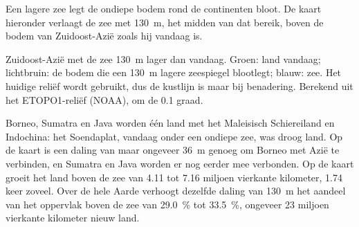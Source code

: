 Een lagere zee legt de ondiepe bodem rond de continenten bloot. De kaart hieronder
verlaagt de zee met \qty{130}{m}, het midden van dat bereik, boven de bodem van
Zuidoost-Azië zoals hij vandaag is.

\begin{omfigure}

{\small Zuidoost-Azië met de zee \qty{130}{m} lager dan vandaag. Groen:
land vandaag; lichtbruin: de bodem die een \qty{130}{m} lagere zeespiegel blootlegt; blauw:
zee. Het huidige reliëf wordt gebruikt, dus de kustlijn is maar bij benadering.
Berekend uit het ETOPO1-reliëf (NOAA), om de 0.1 graad.}
\end{omfigure}

Borneo, Sumatra en Java worden één land met het Maleisisch Schiereiland en
Indochina: het Soendaplat, vandaag onder een ondiepe zee, was droog land. Op de kaart
is een daling van maar ongeveer \qty{36}{m} genoeg om Borneo met Azië te verbinden, en Sumatra en
Java worden er nog eerder mee verbonden. Op de kaart
groeit het land boven de zee van 4.11 tot 7.16 miljoen vierkante kilometer,
1.74 keer zoveel. Over de hele Aarde verhoogt dezelfde daling van \qty{130}{m}
het aandeel van het oppervlak boven de zee van \qty{29.0}{\percent} tot
\qty{33.5}{\percent}, ongeveer 23 miljoen vierkante kilometer nieuw land.

